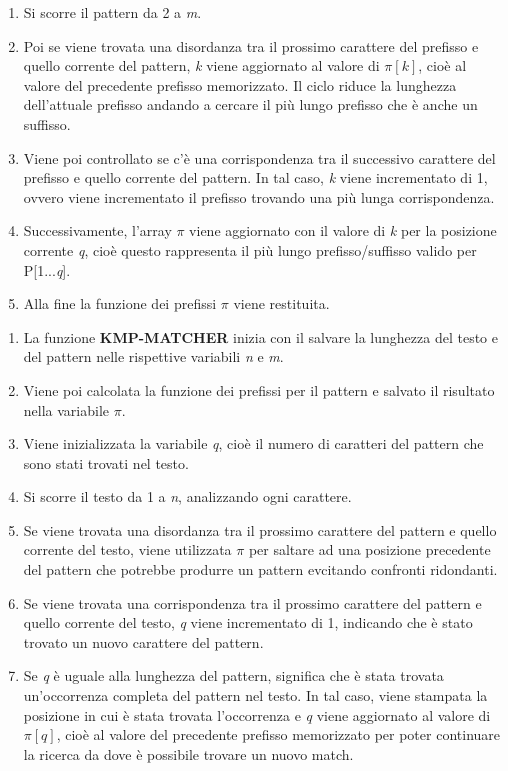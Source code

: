 \documentclass{article}
\begin{document}
\begin{itemize}
\begin{enumerate}[label=\arabic*a.]
              \item Si scorre il pattern da 2 a \textit{m}.
              \item Poi se viene trovata una disordanza tra il prossimo carattere del prefisso e quello corrente del pattern, \textit{k} viene aggiornato al valore di $\pi[k]$, cioè al valore del precedente prefisso memorizzato. Il ciclo riduce la lunghezza dell'attuale prefisso andando a cercare il più lungo prefisso che è anche un suffisso.
              \item Viene poi controllato se c'è una corrispondenza tra il successivo carattere del prefisso e quello corrente del pattern. In tal caso, \textit{k} viene incrementato di 1, ovvero viene incrementato il prefisso trovando una più lunga corrispondenza.
              \item Successivamente, l'array $\pi$ viene aggiornato con il valore di \textit{k} per la posizione corrente \textit{q}, cioè questo rappresenta il più lungo prefisso/suffisso valido per P[1...\textit{q}].
              \item Alla fine la funzione dei prefissi $\pi$ viene restituita.
          \end{enumerate}
          \begin{enumerate}[label=\arabic*b.]
              \item La funzione \textbf{KMP-MATCHER} inizia con il salvare la lunghezza del testo e del pattern nelle rispettive variabili \textit{n} e \textit{m}.
              \item Viene poi calcolata la funzione dei prefissi per il pattern e salvato il risultato nella variabile $\pi$.
              \item Viene inizializzata la variabile \textit{q}, cioè il numero di caratteri del pattern che sono stati trovati nel testo.
              \item Si scorre il testo da 1 a \textit{n}, analizzando ogni carattere.
              \item Se viene trovata una disordanza tra il prossimo carattere del pattern e quello corrente del testo, viene utilizzata $\pi$ per saltare ad una posizione precedente del pattern che potrebbe produrre un pattern evcitando confronti ridondanti.
              \item Se viene trovata una corrispondenza tra il prossimo carattere del pattern e quello corrente del testo, \textit{q} viene incrementato di 1, indicando che è stato trovato un nuovo carattere del pattern.
              \item Se \textit{q} è uguale alla lunghezza del pattern, significa che è stata trovata un'occorrenza completa del pattern nel testo. In tal caso, viene stampata la posizione in cui è stata trovata l'occorrenza e \textit{q} viene aggiornato al valore di $\pi[q]$, cioè al valore del precedente prefisso memorizzato per poter continuare la ricerca da dove è possibile trovare un nuovo match.

\end{enumerate}
\end{itemize}
\end{document}
